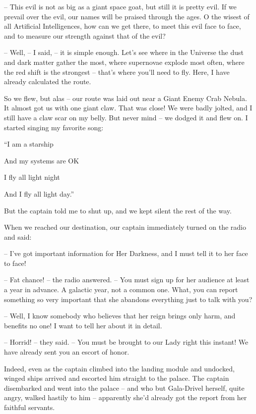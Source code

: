 \documentclass[ebook,oneside,final,openright]{memoir}
\begin{document}
– This evil is not as big as a giant space goat, but still it is pretty evil. If we prevail over the evil, our names will be praised through the ages. O the wisest of all Artificial Intelligences, how can we get there, to meet this evil face to face, and to measure our strength against that of the evil?\par
– Well, – I said, – it is simple enough. Let’s see where in the Universe the dust and dark matter gather the most, where supernovae explode most often, where the red shift is the strongest – that’s where you’ll need to fly. Here, I have already calculated the route.\par
So we flew, but alas – our route was laid out near a Giant Enemy Crab Nebula. It almost got us with one giant claw. That was close! We were badly jolted, and I still have a claw scar on my belly. But never mind – we dodged it and flew on. I started singing my favorite song: \par
“I am a starship \par
 And my systems are OK \par
 I fly all light night \par
 And I fly all light day.”\par
 But the captain told me to shut up, and we kept silent the rest of the way.\par
\par
When we reached our destination, our captain immediately turned on the radio and said:\par
– I’ve got important information for Her Darkness, and I must tell it to her face to face!\par
– Fat chance! – the radio answered. – You must sign up for her audience at least a year in advance. A galactic year, not a common one. What, you can report something so very important that she abandons everything just to talk with you?\par
– Well, I know somebody who believes that her reign brings only harm, and benefits no one! I want to tell her about it in detail.\par
– Horrid! – they said. – You must be brought to our Lady right this instant! We have already sent you an escort of honor.\par
\par
Indeed, even as the captain climbed into the landing module and undocked, winged ships arrived and escorted him straight to the palace. The captain disembarked and went into the palace – and who but Gala-Drivel herself, quite angry, walked hastily to him – apparently she’d already got the report from her faithful servants.\par
\end{document}
